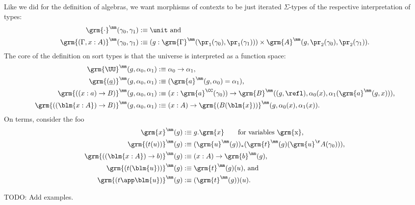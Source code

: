 \begin{defn}
Like we did for the definition of algebras, we want morphisms of contexts to be
just iterated $\Sigma$-types of the respective interpretation of types:
\begin{align*}
\grm{\cdot}^\mm(\gamma_0, \gamma_1) &:\equiv \unit \text{ and} \\
\grm{(\Gamma, x : A)}^\mm(\gamma_0, \gamma_1) &:\equiv
	(g : \grm{\Gamma}^\mm(\pr_1(\gamma_0), \pr_1(\gamma_1))) \times \grm{A}^\mm(g, \pr_2(\gamma_0), \pr_2(\gamma_1)) \text{.}
\end{align*}
The core of the definition on sort types is that the universe is interpreted as
a function space:
\begin{align*}
\grm{\UU}^\mm(g, \alpha_0, \alpha_1)  			&:\equiv \alpha_0 \to \alpha_1 \text{,} \\
\grm{(\underline{a})}^\mm(g, \alpha_0, \alpha_1)	&:\equiv (\grm{a}^\mm(g, \alpha_0) = \alpha_1) \text{,} \\
\grm{((x : a) \to B)}^\mm(g, \alpha_0, \alpha_1)	&:\equiv (x : \grm{a}^\CC(\gamma_0))
							\to \grm{B}^\mm((g, \refl), \alpha_0(x), \alpha_1(\grm{a}^\mm(g, x))) \text{,} \\
\grm{((\blm{x : A}) \to B)}^\mm(g, \alpha_0, \alpha_1)  &:\equiv (x : A)
							\to \grm{(B(\blm{x}))}^\mm(g, \alpha_0(x), \alpha_1(x)) \text{.}
\end{align*}
On terms, consider the foo
\begin{align*}
\grm{x}^\mm(g) 				&:\equiv g.\grm{x} \qquad \text{for variables \grm{x},} \\ %
\grm{(t(u))}^\mm(g)			&:\equiv (\grm{u}^\mm(g))_* (\grm{t}^\mm(g)(\grm{u}^\AA(\gamma_0))) \text{,} \\ %
\grm{((\blm{x : A}) \to b)}^\mm(g)	&:\equiv (x : A) \to \grm{b}^\mm(g) \text{,} \\
\grm{(t(\blm{u}))}^\mm(g)		&:\equiv \grm{t}^\mm(g)(u) \text{, and} \\
\grm{(t \app \blm{u})}^\mm(g)		&:\equiv (\grm{t}^\mm(g))(u) \text{.} %
\end{align*}

\end{defn}

TODO: Add examples.


